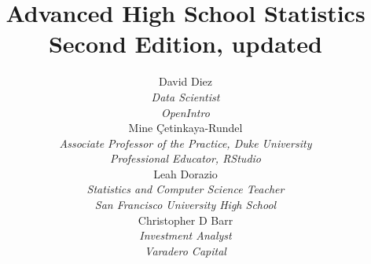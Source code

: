 
\title{\huge Advanced High School Statistics\vspace{1.5mm} \\ \Large Second Edition, updated}
\author{David Diez \\
\small\emph{Data Scientist}\\
\small\emph{OpenIntro} \\[6mm]
Mine \c{C}etinkaya-Rundel \\
\small\emph{Associate Professor of the Practice,
    Duke University} \\
\small\emph{Professional Educator, RStudio} \\[6mm]
Leah Dorazio \\
\small\emph{Statistics and Computer Science Teacher}\\
\small\emph{San Francisco University High School} \\[6mm]
Christopher D Barr \\
\small\emph{Investment Analyst} \\
\small\emph{Varadero Capital} \\
}
